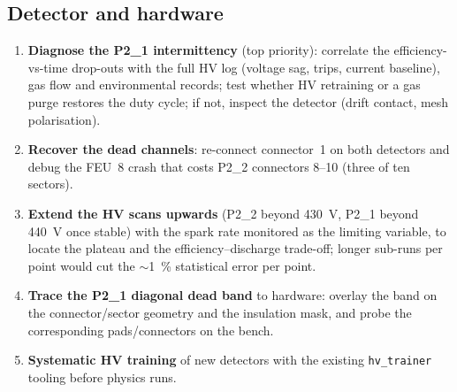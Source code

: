 \documentclass[11pt,a4paper]{article}
\newcommand{\detone}{P2\_1}
\newcommand{\dettwo}{P2\_2}
\newcommand{\code}[1]{\texttt{#1}}
\begin{document}
\subsection{Detector and hardware}
\begin{enumerate}[itemsep=2pt]
  \item \textbf{Diagnose the \detone{} intermittency} (top priority):
        correlate the efficiency-vs-time drop-outs with the full HV log
        (voltage sag, trips, current baseline), gas flow and environmental
        records; test whether HV retraining or a gas purge restores the
        duty cycle; if not, inspect the detector (drift contact, mesh
        polarisation).
  \item \textbf{Recover the dead channels}: re-connect connector~1 on both
        detectors and debug the FEU~8 crash that costs \dettwo{} connectors
        8--10 (three of ten sectors).
  \item \textbf{Extend the HV scans upwards} (\dettwo{} beyond \SI{430}{V},
        \detone{} beyond \SI{440}{V} once stable) with the spark rate
        monitored as the limiting variable, to locate the plateau and the
        efficiency--discharge trade-off; longer sub-runs per point would cut
        the $\sim$\SI{1}{\percent} statistical error per point.
  \item \textbf{Trace the \detone{} diagonal dead band} to hardware: overlay
        the band on the connector/sector geometry and the insulation mask,
        and probe the corresponding pads/connectors on the bench.
  \item \textbf{Systematic HV training} of new detectors with the existing
        \code{hv\_trainer} tooling before physics runs.
\end{enumerate}
\end{document}
